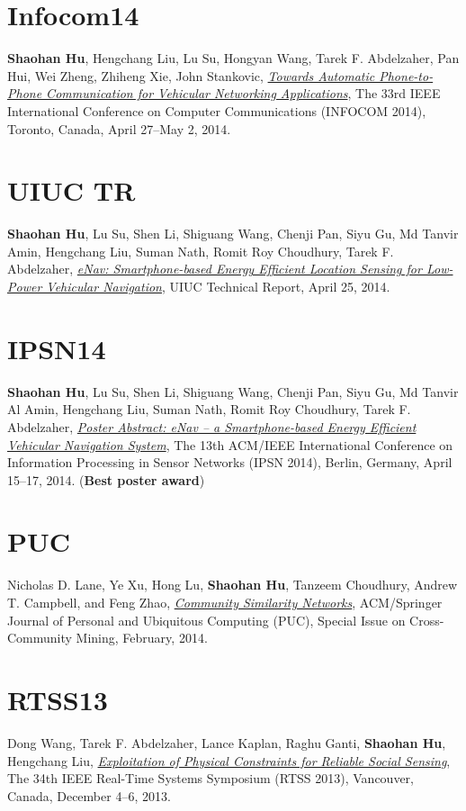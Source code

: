 \section{\sc Infocom14}\hypertarget{hu2014infocom}{}
\textbf{Shaohan Hu}, Hengchang Liu, Lu Su, Hongyan Wang, Tarek F.
Abdelzaher, Pan Hui, Wei Zheng, Zhiheng Xie, John Stankovic,
\href{}{\emph{Towards Automatic Phone-to-Phone Communication for Vehicular
  Networking Applications}}, \textsf{The 33rd IEEE International Conference on Computer Communications (INFOCOM 2014)}, Toronto, Canada, April 27--May 2, 2014.

\section{\sc UIUC TR}\hypertarget{hu2014uiuc1}{}
\textbf{Shaohan Hu}, Lu Su, Shen Li, Shiguang Wang, Chenji Pan, Siyu Gu, Md Tanvir Amin,
Hengchang Liu, Suman Nath, Romit Roy Choudhury, Tarek F. Abdelzaher, \href{https://www.ideals.illinois.edu/handle/2142/48917}{\emph{eNav:
  Smartphone-based Energy Efficient Location Sensing for Low-Power
  Vehicular Navigation}}, \textsf{UIUC Technical Report}, April 25, 2014.

\section{\sc IPSN14}\hypertarget{hu2014ipsn}{}
\textbf{Shaohan Hu}, Lu Su, Shen Li, Shiguang Wang, Chenji Pan, Siyu Gu, Md Tanvir Al Amin, Hengchang Liu, Suman Nath, Romit Roy Choudhury, Tarek F.
Abdelzaher, \href{http://dl.acm.org/citation.cfm?id=2602374}{\emph{Poster Abstract: eNav -- a Smartphone-based Energy Efficient Vehicular Navigation System}}, \textsf{The 13th
  ACM/IEEE International Conference on Information Processing in
  Sensor Networks (IPSN 2014)}, Berlin, Germany, April 15--17, 2014. (\textbf{Best poster award})

\section{\sc PUC}\hypertarget{lane2013puc}{}
Nicholas D. Lane, Ye Xu, Hong Lu, \textbf{Shaohan Hu}, Tanzeem Choudhury, Andrew T. Campbell, and Feng Zhao, \href{http://link.springer.com/article/10.1007/s00779-013-0655-1}{\emph{Community Similarity Networks}}, \textsf{ACM/Springer Journal of Personal and Ubiquitous Computing (PUC), Special Issue on Cross-Community Mining}, February, 2014.

\section{\sc RTSS13}\hypertarget{wang2013rtss}{}
Dong Wang, Tarek F. Abdelzaher, Lance Kaplan, Raghu Ganti,
\textbf{Shaohan Hu}, Hengchang Liu, \href{http://ieeexplore.ieee.org/xpl/articleDetails.jsp?tp=&arnumber=6728876}{\emph{Exploitation of Physical
  Constraints for Reliable Social Sensing}}, \textsf{The 34th IEEE
  Real-Time Systems Symposium (RTSS 2013)}, Vancouver, Canada,
December 4--6, 2013.

